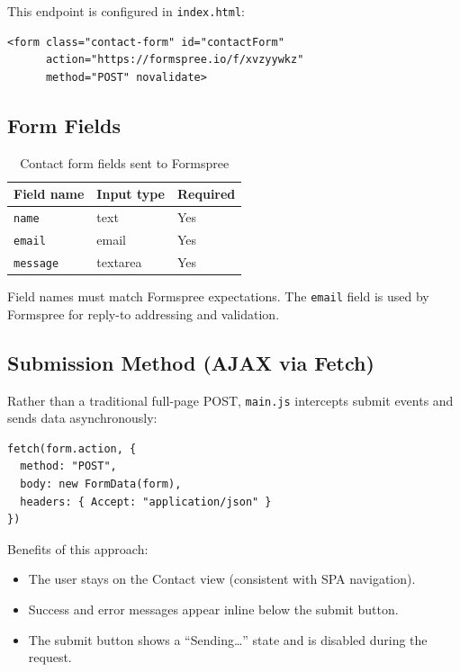 \documentclass[11pt,a4paper]{article}
\begin{document}
This endpoint is configured in \texttt{index.html}:

\begin{lstlisting}
<form class="contact-form" id="contactForm"
      action="https://formspree.io/f/xvzyywkz"
      method="POST" novalidate>
\end{lstlisting}

\subsection{Form Fields}

\begin{table}[h]
  \centering
  \begin{tabular}{@{}lll@{}}
    \toprule
    \textbf{Field name} & \textbf{Input type} & \textbf{Required} \\
    \midrule
    \texttt{name}    & text     & Yes \\
    \texttt{email}   & email    & Yes \\
    \texttt{message} & textarea & Yes \\
    \bottomrule
  \end{tabular}
  \caption{Contact form fields sent to Formspree}
\end{table}

Field names must match Formspree expectations. The \texttt{email} field is
used by Formspree for reply-to addressing and validation.

\subsection{Submission Method (AJAX via Fetch)}

Rather than a traditional full-page POST, \texttt{main.js} intercepts submit
events and sends data asynchronously:

\begin{lstlisting}
fetch(form.action, {
  method: "POST",
  body: new FormData(form),
  headers: { Accept: "application/json" }
})
\end{lstlisting}

Benefits of this approach:

\begin{itemize}[noitemsep]
  \item The user stays on the Contact view (consistent with SPA navigation).
  \item Success and error messages appear inline below the submit button.
  \item The submit button shows a ``Sending\ldots'' state and is disabled
        during the request.
\end{itemize}
\end{document}
